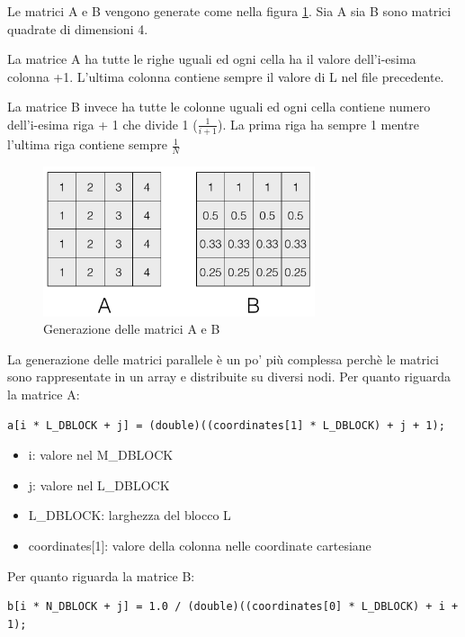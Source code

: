 Le matrici A e B vengono generate come nella figura \ref{fig:matrix_gen}. Sia A sia B sono matrici quadrate di dimensioni 4.

La matrice A ha tutte le righe uguali ed ogni cella ha il valore dell'i-esima colonna +1. L'ultima colonna contiene sempre il valore di L nel file precedente.

La matrice B invece ha tutte le colonne uguali ed ogni cella contiene numero dell'i-esima riga + 1 che divide 1 ($\frac{1}{i+1}$). La prima riga ha sempre 1 mentre l'ultima riga contiene sempre $\frac{1}{N}$

\begin{figure}[htbp]
    \begin{center}
        \includegraphics[width=8cm]{immagini/matrix_gen.png}
    \end{center}
    \caption{Generazione delle matrici A e B}
    \label{fig:matrix_gen}
\end{figure}

La generazione delle matrici parallele \`{e} un po' pi\`{u} complessa perch\`{e} le matrici sono rappresentate in un array e distribuite su diversi nodi.
Per quanto riguarda la matrice A:

\begin{lstlisting}
a[i * L_DBLOCK + j] = (double)((coordinates[1] * L_DBLOCK) + j + 1);
\end{lstlisting}

\begin{itemize}
  \item i: valore nel M\_DBLOCK
  \item j: valore nel L\_DBLOCK
  \item L\_DBLOCK: larghezza del blocco L
  \item coordinates[1]: valore della colonna nelle coordinate cartesiane
\end{itemize}

Per quanto riguarda la matrice B:

\begin{lstlisting}
b[i * N_DBLOCK + j] = 1.0 / (double)((coordinates[0] * L_DBLOCK) + i + 1);
\end{lstlisting}

